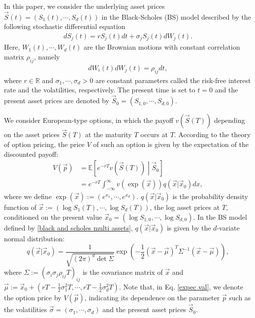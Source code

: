 In this paper, we consider the underlying asset prices $\vec{S}(t)=(S_1(t),\cdots,S_d(t))$ in the Black-Scholes (BS) model described by the following stochastic differential equation
\begin{align}
    dS_{j}(t) = rS_{j}(t)dt + \sigma_j S_{j}(t) dW_{j}(t).
\label{black and scholes multi assets}
\end{align}
Here, $W_1(t),\cdots,W_d(t)$ are the Brownian motions with constant correlation matrix $\rho_{ij}$, namely
\begin{align}
    dW_{i}(t) dW_{j}(t) = \rho_{ij}dt, \tag{10}
\label{gauss correlation}
\end{align}
where $r\in\mathbb{R}$ and $\sigma_1,\cdots,\sigma_d>0$ are constant parameters called the risk-free interest rate and the volatilities, respectively.
The present time is set to $t=0$ and the present asset prices are denoted by $\vec{S}_0=(S_{1,0},\cdots,S_{d,0})$.

We consider European-type options, in which the payoff $v(\vec{S}(T))$ depending on the asset prices $\vec{S}(T)$ at the maturity $T$ occurs at $T$.
According to the theory of option pricing, the price $V$ of such an option is given by the expectation of the discounted payoff:
\begin{align}
    V(\vec{p})&=\mathbb{E}\left[e^{-rT}v(\vec{S}(T))\middle|\vec{S}_0\right] \nonumber \\
    &=e^{-rT} \int_{-\infty}^{\infty} v(\exp(\vec{x}))q(\vec{x}|\vec{x}_0)dx,
    \label{expec val}
\end{align}
where we define $\exp(\vec{x}):=(e^{x_1},\cdots,e^{x_d})$.
$q(\vec{x}|\vec{x}_0)$ is the probability density function of $\vec{x}:=(\log S_1(T),\cdots,\log S_d(T))$, the log asset prices at $T$, conditioned on the present value $\vec{x}_0=(\log S_{1,0},\cdots,\log S_{d,0})$.
In the BS model defined by \eqref{black and scholes multi assets}, $q(\vec{x}|\vec{x}_0)$ is given by the $d$-variate normal distribution:
\begin{equation}
    q(\vec{x}|\vec{x}_0) = \frac{1}{\sqrt{(2 \pi)^d \det \Sigma}} \exp\left(-\frac{1}{2}\left(\vec{x}-\vec{\mu}\right)^T \Sigma^{-1} \left(\vec{x}-\vec{\mu}\right)\right),
\end{equation}
where $\Sigma:=(\sigma_i\sigma_j \rho_{ij}T)_{ij}$ is the covariance matrix of $\vec{x}$ and $\vec{\mu}:=\vec{x}_0+\left(rT-\frac{1}{2}\sigma_1^2T,\cdots,rT-\frac{1}{2}\sigma_d^2T\right)$.
Note that, in Eq. \eqref{expec val}, we denote the option price by $V(\vec{p})$, indicating its dependence on the parameter $\vec{p}$ such as the volatilities $\vec{\sigma}=(\sigma_1,\cdots,\sigma_d)$ and the present asset prices $\vec{S}_0$.


